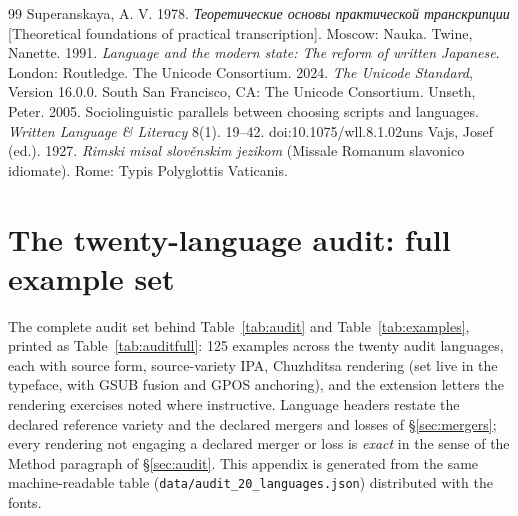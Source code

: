 \documentclass[12pt]{article}
\begin{document}
\begin{thebibliography}{99}
 Superanskaya, A. V. 1978. \emph{Теоретические основы практической транскрипции} [Theoretical foundations of practical transcription]. Moscow: Nauka.
 Twine, Nanette. 1991. \emph{Language and the modern state: The reform of written Japanese}. London: Routledge.
 The Unicode Consortium. 2024. \emph{The Unicode Standard}, Version 16.0.0. South San Francisco, CA: The Unicode Consortium.
 Unseth, Peter. 2005. Sociolinguistic parallels between choosing scripts and languages. \emph{Written Language \& Literacy} 8(1). 19--42. doi:10.1075/wll.8.1.02uns
 Vajs, Josef (ed.). 1927. \emph{Rimski misal slov\v{e}nskim jezikom} (Missale Romanum slavonico idiomate). Rome: Typis Polyglottis Vaticanis.
\end{thebibliography}

\appendix
\renewcommand{\thetable}{A\arabic{table}}\setcounter{table}{0}
\section{The twenty-language audit: full example set}\label{app:audit}

\noindent The complete audit set behind Table~\ref{tab:audit} and Table~\ref{tab:examples}, printed as Table~\ref{tab:auditfull}: 125 examples across the twenty audit languages, each with source form, source-variety IPA, Chuzhditsa rendering (set live in the typeface, with GSUB fusion and GPOS anchoring), and the extension letters the rendering exercises noted where instructive. Language headers restate the declared reference variety and the declared mergers and losses of \S\ref{sec:mergers}; every rendering not engaging a declared merger or loss is \emph{exact} in the sense of the Method paragraph of \S\ref{sec:audit}. This appendix is generated from the same machine-readable table (\texttt{data/audit\_20\_languages.json}) distributed with the fonts.


\end{document}
